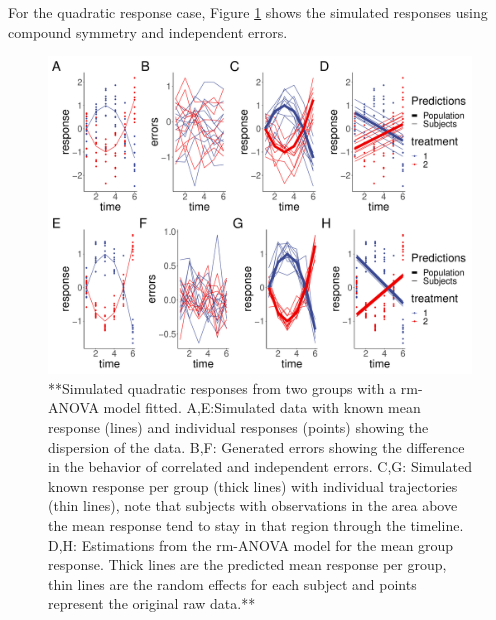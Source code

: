 \documentclass[
]{article}
\begin{document}
For the quadratic response case, Figure \ref{fig:quadratic-cases} shows the simulated responses using compound symmetry and independent errors.

\begin{figure}[!h]
\includegraphics{Manuscript_AM_v5_files/figure-latex/quadratic-cases-1} \caption{**Simulated quadratic responses from two groups with a rm-ANOVA model fitted. A,E:Simulated data with known mean response (lines) and individual responses (points) showing the dispersion of the data. B,F: Generated errors showing the difference in the behavior of correlated and independent errors.  C,G: Simulated known response per group (thick lines) with individual trajectories (thin lines), note that subjects with observations in the area above the mean response tend to stay in that region through the timeline. D,H: Estimations from the rm-ANOVA model for the mean group response. Thick lines are the predicted mean response per group, thin lines are the random effects for each subject and points represent the original raw data.**}\label{fig:quadratic-cases}
\end{figure}
\end{document}
